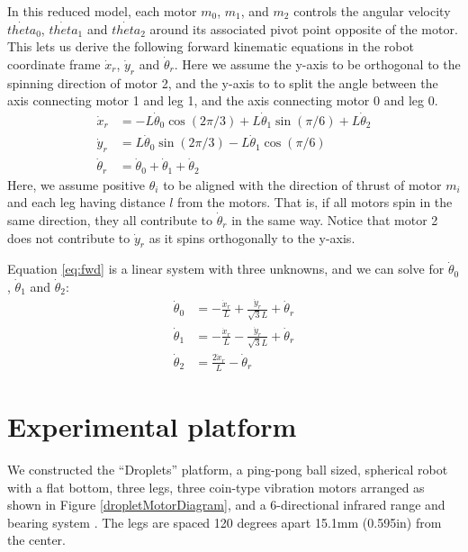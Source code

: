 \documentclass[letterpaper, 10pt, conference]{ieeeconf}
\begin{document}
In this reduced model, each motor $m_0$, $m_1$, and $m_2$ controls the angular velocity $\dot{theta}_0$, $\dot{theta}_1$ and $\dot{theta}_2$ around its associated pivot point opposite of the motor. This lets us derive the following forward kinematic equations in the robot coordinate frame $\dot{x}_r$, $\dot{y}_r$ and $\dot{\theta}_r$.
Here we assume the y-axis to be orthogonal to the spinning direction of motor 2, and the y-axis to to split the angle between the axis connecting motor 1 and leg 1, and the axis connecting motor 0 and leg 0.
\begin{align}\label{eq:fwd}
\dot{x}_r & = -L \dot{\theta}_0 \cos(2 \pi / 3) + L \dot{\theta}_1 \sin(\pi / 6) + L \dot{\theta}_2\\
\dot{y}_r & =  L \dot{\theta}_0 \sin(2 \pi / 3) - L \dot{\theta}_1 \cos(\pi / 6)\\
\dot{\theta}_r & = \dot{\theta}_0 + \dot{\theta}_1 + \dot{\theta}_2
\end{align}
Here, we assume positive $\theta_i$ to be aligned with the direction of thrust of motor $m_i$ and each leg having distance $l$ from the motors. That is, if all motors spin in the same direction, they all contribute to $\dot{\theta}_r$ in the same way. Notice that motor 2 does not contribute to $\dot{y}_r$ as it spins orthogonally to the y-axis.

Equation \ref{eq:fwd} is a linear system with three unknowns, and we can solve for $\dot{\theta}_0$, $\dot{\theta}_1$ and $\dot{\theta}_2$:
\begin{align}
\dot{\theta}_0 & = -\frac{\dot{x}_r}{L} + \frac{\dot{y}_r}{\sqrt{3}L} + \dot{\theta}_r\\
\dot{\theta}_1 & = -\frac{\dot{x}_r}{L} - \frac{\dot{y}_r}{\sqrt{3}L} + \dot{\theta}_r\\
\dot{\theta}_2 & = \frac{2 \dot{x}_r}{L} - \dot{\theta}_r
\end{align}

\section{Experimental platform}
We constructed the ``Droplets'' platform, a ping-pong ball sized, spherical robot with a flat bottom, three legs, three coin-type vibration motors arranged as shown in Figure \ref{dropletMotorDiagram}, and a 6-directional infrared range and bearing system \cite{farrow14}. The legs are spaced 120 degrees apart 15.1mm (0.595in) from the center.
\end{document}
